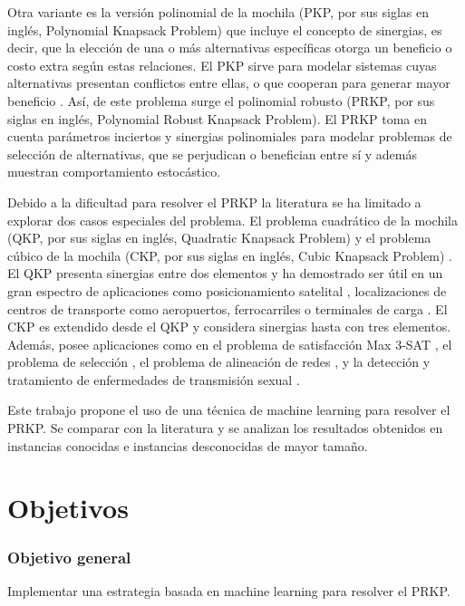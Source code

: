 \documentclass[spanish, a4paper, 12pt, openany,final]{book}
\begin{document}
Otra variante es la versión polinomial de la mochila (PKP, por sus siglas en inglés, Polynomial Knapsack Problem) que incluye el concepto de sinergias, es decir, que la elección de una o más alternativas específicas otorga un beneficio o costo extra según estas relaciones. El PKP sirve para modelar sistemas cuyas alternativas presentan conflictos entre ellas, o que cooperan para generar mayor beneficio \citep{baldo_polynomial_2023}. Así, de este problema surge el polinomial robusto (PRKP, por sus siglas en inglés, Polynomial Robust Knapsack Problem). El PRKP toma en cuenta parámetros inciertos y sinergias polinomiales para modelar problemas de selección de alternativas, que se perjudican o benefician entre sí y además muestran comportamiento estocástico.

Debido a la dificultad para resolver el PRKP la literatura se ha limitado a explorar dos casos especiales del problema. El problema cuadrático de la mochila (QKP, por sus siglas en inglés, Quadratic Knapsack Problem) \citep{gallo_quadratic_1980} y el problema cúbico de la mochila (CKP, por sus siglas en inglés, Cubic Knapsack Problem) \citep{forrester_strengthening_2022}. El QKP presenta sinergias entre dos elementos y ha demostrado ser útil en un gran espectro de aplicaciones como posicionamiento satelital \citep{witzgall_mathematical_1975}, localizaciones de centros de transporte como aeropuertos, ferrocarriles o terminales de carga \citep{rhys_selection_1970}. El CKP es extendido desde el QKP y considera sinergias hasta con tres elementos. Además, posee aplicaciones como en el problema de satisfacción Max 3-SAT \citep{kofler_penalty_2014}, el problema de selección \citep{gallo_fast_1989}, el problema de alineación de redes \citep{mohammadi_triangular_2017}, y la detección y tratamiento de enfermedades de transmisión sexual \citep{zhao_treatments_2008}.

Este trabajo propone el uso de una técnica de machine learning para resolver el PRKP. Se comparar con la literatura y se analizan los resultados obtenidos en instancias conocidas e instancias desconocidas de mayor tamaño.

\section{Objetivos}
\subsubsection*{Objetivo general}
Implementar una estrategia basada en machine learning para resolver el PRKP.
\end{document}
